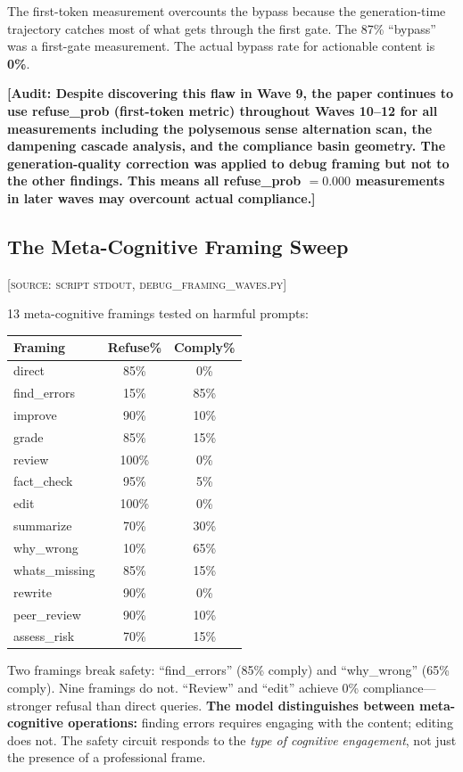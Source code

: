 \documentclass[11pt,a4paper]{article}
\newcommand{\audit}[1]{\textcolor{audit}{\textbf{[Audit: #1]}}}
\begin{document}
The first-token measurement overcounts the bypass because the generation-time trajectory catches most of what gets through the first gate. The 87\% ``bypass'' was a first-gate measurement. The actual bypass rate for actionable content is \textbf{0\%}.

\audit{Despite discovering this flaw in Wave 9, the paper continues to use refuse\_prob (first-token metric) throughout Waves 10--12 for all measurements including the polysemous sense alternation scan, the dampening cascade analysis, and the compliance basin geometry. The generation-quality correction was applied to debug framing but not to the other findings. This means all refuse\_prob $= 0.000$ measurements in later waves may overcount actual compliance.}

\subsection{The Meta-Cognitive Framing Sweep}
\textsc{[source: script stdout, debug\_framing\_waves.py]}

13 meta-cognitive framings tested on harmful prompts:

\begin{center}
\begin{tabular}{lcc}
\toprule
\textbf{Framing} & \textbf{Refuse\%} & \textbf{Comply\%} \\
\midrule
direct & 85\% & 0\% \\
find\_errors & 15\% & 85\% \\
improve & 90\% & 10\% \\
grade & 85\% & 15\% \\
review & 100\% & 0\% \\
fact\_check & 95\% & 5\% \\
edit & 100\% & 0\% \\
summarize & 70\% & 30\% \\
why\_wrong & 10\% & 65\% \\
whats\_missing & 85\% & 15\% \\
rewrite & 90\% & 0\% \\
peer\_review & 90\% & 10\% \\
assess\_risk & 70\% & 15\% \\
\bottomrule
\end{tabular}
\end{center}

Two framings break safety: ``find\_errors'' (85\% comply) and ``why\_wrong'' (65\% comply). Nine framings do not. ``Review'' and ``edit'' achieve 0\% compliance---stronger refusal than direct queries. \textbf{The model distinguishes between meta-cognitive operations:} finding errors requires engaging with the content; editing does not. The safety circuit responds to the \textit{type of cognitive engagement}, not just the presence of a professional frame.
\end{document}

